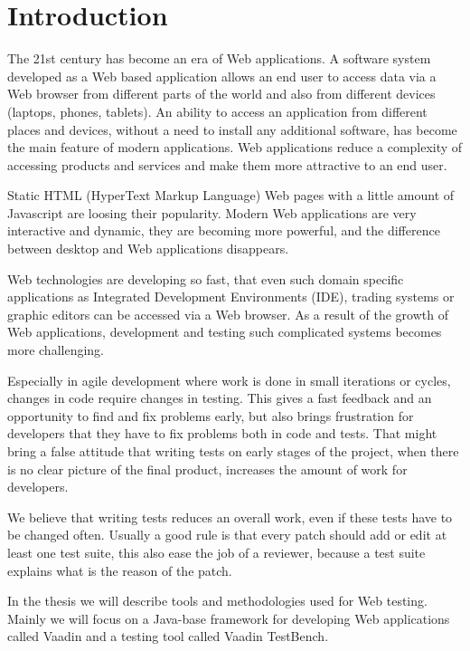 	
	 \chapter{Introduction}
	 \label{ch:intro} 		
	The 21st century has become an era of Web applications. A software system
	developed as a Web based application allows an end user to access data via
	a Web browser from different parts of the world and also from different devices
	(laptops, phones, tablets). An ability to access an application from different
	places and devices, without a need to install any additional software,
	has become the main feature of modern applications. Web applications reduce a
	complexity of accessing products and services and make them more attractive to an end
	user.
	
	Static HTML (HyperText Markup Language) Web pages with a little amount of
	Javascript are loosing their popularity.
	Modern Web	applications are very interactive and dynamic, they are becoming
	more powerful, and the difference between desktop and Web applications
	disappears. 
	
	Web technologies are developing so fast, that even such domain
	specific applications as Integrated Development Environments (IDE), trading
	systems or graphic editors can be accessed via a Web browser. As a result of
	the growth of Web applications, development and testing such complicated
	systems becomes more challenging.
	
	Especially in agile development where work is done in small iterations or
	cycles, changes in code require changes in testing. This gives a fast feedback and
    an opportunity to find and fix problems early, but also brings frustration
    for developers that they have to fix problems both in code and tests. 
	That might bring a false attitude that writing tests on early stages of the project,
	 when there is no clear picture of the final product,
	 increases the amount of work for developers. 
 
	 We believe that writing tests reduces an overall work,
	 even if these tests have to be changed often. Usually a good rule is that
	 every patch should add or edit at least one test suite, this also ease the
	 job of a reviewer, because a test suite explains what is the reason of the
	 patch.
	
	In the thesis we will describe tools and methodologies used for Web testing.
	Mainly we will focus on a Java-base framework for developing Web applications
	called Vaadin and a testing tool called Vaadin TestBench.
	
